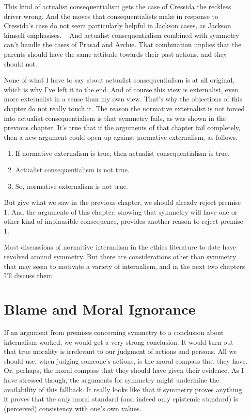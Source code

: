 This kind of actualist consequentialism gets the case of \gls{Cressida} the reckless driver wrong. And the moves that consequentialists make in response to \gls{Cressida}'s case do not seem particularly helpful in Jackson cases, as Jackson himself emphasises. ~\citep{Jackson1991} And actualist consequentialism combined with symmetry can't handle the cases of \gls{Prasad} and \gls{Archie}. That combination implies that the parents should have the same attitude towards their past actions, and they should not.

None of what I have to say about actualist consequentialism is at all original, which is why I've left it to the end. And of course this view is externalist, even more externalist in a sense than my own view. That's why the objections of this chapter do not really touch it. The reason the normative externalist is not forced into actualist consequentialism is that symmetry fails, as was shown in the previous chapter. It's true that if the arguments of that chapter fail completely, then a new argument could open up against normative externalism, as follows.

\begin{enumerate}
\item{} If normative externalism is true, then actualist consequentialism is true.

\item{} Actualist consequentialism is not true.

\item{} So, normative externalism is not true.

\end{enumerate}
But give what we saw in the previous chapter, we should already reject premise 1. And the arguments of this chapter, showing that symmetry will have one or other kind of implausible consequence, provides another reason to reject premise 1.

Most discussions of normative internalism in the ethics literature to date have revolved around symmetry. But there are considerations other than symmetry that may seem to motivate a variety of internalism, and in the next two chapters I'll discuss them.

\chapter{Blame and Moral Ignorance}
\label{blameandmoralignorance}

If an argument from premises concerning symmetry to a conclusion about internalism worked, we would get a very strong conclusion. It would turn out that true morality is irrelevant to our judgment of actions and persons. All we should use, when judging someone's actions, is the moral compass that they have. Or, perhaps, the moral compass that they should have given their evidence. As I have stressed though, the arguments for symmetry might undermine the availability of this fallback. It really looks like that if symmetry proves anything, it proves that the only moral standard (and indeed only epistemic standard) is (perceived) consistency with one's own values.

